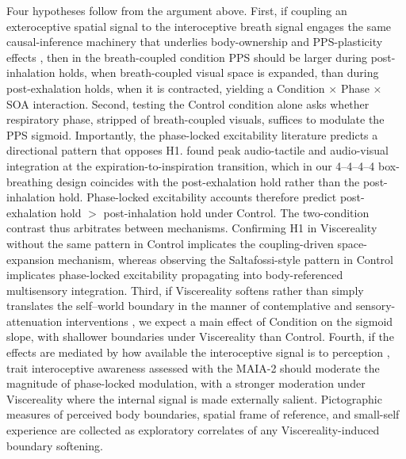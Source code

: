 Four hypotheses follow from the argument above. First, if coupling an exteroceptive spatial signal to the interoceptive breath signal engages the same causal-inference machinery that underlies body-ownership and PPS-plasticity effects \citep{samad_2015, chancel_2021, Ardizzi2018}, then in the breath-coupled condition PPS should be larger during post-inhalation holds, when breath-coupled visual space is expanded, than during post-exhalation holds, when it is contracted, yielding a Condition $\times$ Phase $\times$ SOA interaction. Second, testing the Control condition alone asks whether respiratory phase, stripped of breath-coupled visuals, suffices to modulate the PPS sigmoid. Importantly, the phase-locked excitability literature predicts a directional pattern that opposes H1. \citet{saltafossi_2025} found peak audio-tactile and audio-visual integration at the expiration-to-inspiration transition, which in our 4--4--4--4 box-breathing design coincides with the post-exhalation hold rather than the post-inhalation hold. Phase-locked excitability accounts \citep{saltafossi_2025, kluger_2021, grund_2021} therefore predict post-exhalation hold $>$ post-inhalation hold under Control. The two-condition contrast thus arbitrates between mechanisms. Confirming H1 in Viscereality without the same pattern in Control implicates the coupling-driven space-expansion mechanism, whereas observing the Saltafossi-style pattern in Control implicates phase-locked excitability propagating into body-referenced multisensory integration. Third, if Viscereality softens rather than simply translates the self--world boundary in the manner of contemplative and sensory-attenuation interventions \citep{Chiarella2024, hanley_2020, hruby_2024, nguyen_2020}, we expect a main effect of Condition on the sigmoid slope, with shallower boundaries under Viscereality than Control. Fourth, if the effects are mediated by how available the interoceptive signal is to perception \citep{Ardizzi2018, salvato_2020, bogdanova_2021, Goral2024}, trait interoceptive awareness assessed with the MAIA-2 should moderate the magnitude of phase-locked modulation, with a stronger moderation under Viscereality where the internal signal is made externally salient. Pictographic measures of perceived body boundaries, spatial frame of reference, and small-self experience are collected as exploratory correlates of any Viscereality-induced boundary softening.

